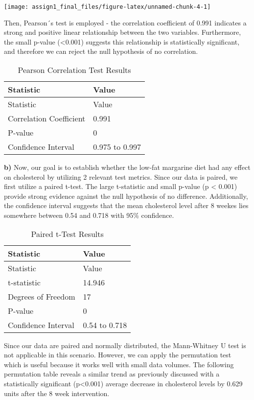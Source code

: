 \documentclass[
]{article}
\begin{document}
\begin{center}\texttt{[image: assign1\_final\_files/figure-latex/unnamed-chunk-4-1]} \end{center}

Then, Pearson´s test is employed - the correlation coefficient of 0.991
indicates a strong and positive linear relationship between the two
variables. Furthermore, the small p-value (\textless0.001) suggests this
relationship is statistically significant, and therefore we can reject
the null hypothesis of no correlation.

\begin{longtable}[]{@{}ll@{}}
\caption{Pearson Correlation Test Results}\tabularnewline
\toprule\noalign{}
Statistic & Value \\
\midrule\noalign{}
\endfirsthead
\toprule\noalign{}
Statistic & Value \\
\midrule\noalign{}
\endhead
\bottomrule\noalign{}
\endlastfoot
Correlation Coefficient & 0.991 \\
P-value & 0 \\
Confidence Interval & 0.975 to 0.997 \\
\end{longtable}

\textbf{b)} Now, our goal is to establish whether the low-fat margarine
diet had any effect on cholesterol by utilizing 2 relevant test metrics.
Since our data is paired, we first utilize a paired t-test. The large
t-statistic and small p-value (p \textless{} 0.001) provide strong
evidence against the null hypothesis of no difference. Additionally, the
confidence interval suggests that the mean cholesterol level after 8
weekes lies somewhere between 0.54 and 0.718 with 95\% confidence.

\begin{longtable}[]{@{}ll@{}}
\caption{Paired t-Test Results}\tabularnewline
\toprule\noalign{}
Statistic & Value \\
\midrule\noalign{}
\endfirsthead
\toprule\noalign{}
Statistic & Value \\
\midrule\noalign{}
\endhead
\bottomrule\noalign{}
\endlastfoot
t-statistic & 14.946 \\
Degrees of Freedom & 17 \\
P-value & 0 \\
Confidence Interval & 0.54 to 0.718 \\
\end{longtable}

Since our data are paired and normally distributed, the Mann-Whitney U
test is not applicable in this scenario. However, we can apply the
permutation test which is useful because it works well with small data
volumes. The following permutation table reveals a similar trend as
previously discussed with a statistically significant (p\textless0.001)
average decrease in cholesterol levels by 0.629 units after the 8 week
intervention.
\end{document}

